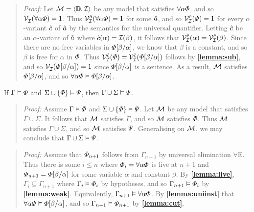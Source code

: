 \begin{quote} 
  \textit{Proof:} Let $\mathcal{M}=\langle\mathbb{D},\mathcal{I}\rangle$ be any model that satisfies $\forall \alpha\varPhi$, and so $\mathcal{V}_{\mathcal{I}}^{}(\forall \alpha\varPhi)=1$.
  Thus $\mathcal{V}_{\mathcal{I}}^{\hat{a}}(\forall \alpha\varPhi)=1$ for some $\hat{a}$, and so $\mathcal{V}_{\mathcal{I}}^{\hat{c}}(\varPhi)=1$ for every $\alpha$-variant $\hat{c}$ of $\hat{a}$ by the semantics for the universal quantifier.
  Letting $\hat{c}$ be an $\alpha$-variant of $\hat{a}$ where $\hat{c}(\alpha)=\mathcal{I}(\beta)$, it follows that $\mathcal{V}_{\mathcal{I}}^{\hat{c}}(\alpha)=\mathcal{V}_{\mathcal{I}}^{\hat{c}}(\beta)$.
  Since there are no free variables in $\varPhi[\beta/\alpha]$, we know that $\beta$ is a constant, and so $\beta$ is free for $\alpha$ in $\varPhi$.
  Thus $\mathcal{V}_{\mathcal{I}}^{\hat{c}}(\varPhi)=\mathcal{V}_{\mathcal{I}}^{\hat{c}}(\varPhi[\beta/\alpha])$ follows by \textbf{\ref{lemma:sub}}, and so $\mathcal{V}_{\mathcal{I}}^{}(\varPhi[\beta/\alpha])=1$ since $\varPhi[\beta/\alpha]$ is a sentence.
  As a result, $\mathcal{M}$ satisfies $\varPhi[\beta/\alpha]$, and so $\forall\alpha\varPhi \vDash \varPhi[\beta/\alpha]$.
\end{quote}






\begin{Lthm} \label{lemma:cut}
  If $\Gamma \vDash \varPhi$ and $\Sigma \cup \lbrace\varPhi\rbrace \vDash \varPsi$, then $\Gamma\cup\Sigma \vDash \varPsi$. 
\end{Lthm}

\begin{quote} 
  \textit{Proof:} Assume $\Gamma \vDash \varPhi$ and $\Sigma \cup \lbrace\varPhi\rbrace \vDash \varPsi$.
  Let $\mathcal{M}$ be any model that satisfies $\Gamma\cup\Sigma$.
  It follows that $\mathcal{M}$ satisfies $\Gamma$, and so $\mathcal{M}$ satisfies $\varPhi$.
  Thus $\mathcal{M}$ satisfies $\Gamma\cup\Sigma$, and so $\mathcal{M}$ satisfies $\varPsi$.
  Generalising on $\mathcal{M}$, we may conclude that $\Gamma\cup\Sigma\vDash\varPsi$.
\end{quote}






\label{rule:UniE}

\begin{quote} 
  \textit{Proof:} Assume that $\varPhi_{n+1}$ follows from $\Gamma_{n+1}$ by universal elimination $\forall$E.
  Thus there is some $i\leq n$ where $\varPhi_i=\forall \alpha\varPhi$ is live at $n+1$ and $\varPhi_{n+1}=\varPhi[\beta/\alpha]$ for some variable $\alpha$ and constant $\beta$.
  By \textbf{\ref{lemma:live}}, $\Gamma_i\subseteq \Gamma_{n+1}$ where $\Gamma_i\vDash\varPhi_i$ by hypotheses, and so $\Gamma_{n+1} \vDash \varPhi_i$ by \textbf{\ref{lemma:weak}}.
  Equivalently, $\Gamma_{n+1} \vDash \forall \alpha\varPhi$.
  By \textbf{\ref{lemma:uniinst}} that $\forall \alpha\varPhi\vDash \varPhi[\beta/\alpha]$, and so $\Gamma_{n+1}\vDash\varPhi_{n+1}$ by \textbf{\ref{lemma:cut}}.
\end{quote}







